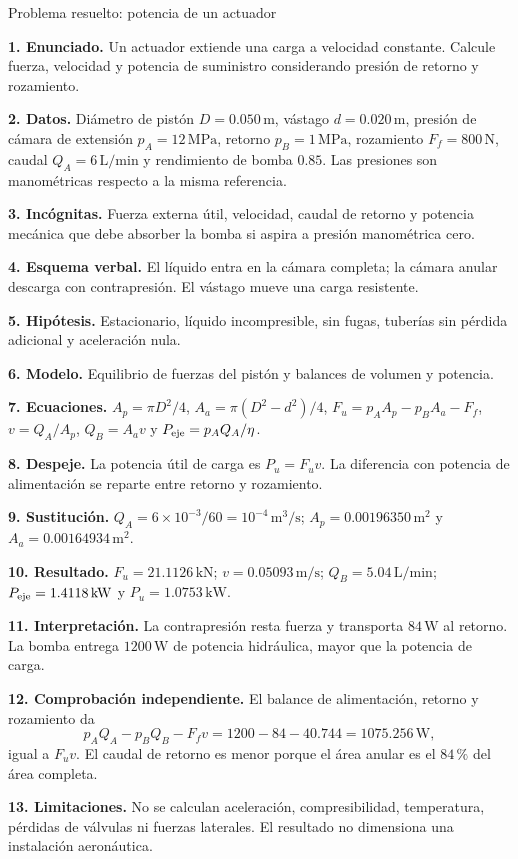 \begin{studiumworked}{Problema resuelto: potencia de un actuador}

\textbf{1. Enunciado.} Un actuador extiende una carga a velocidad constante. Calcule fuerza, velocidad y potencia de suministro considerando presión de retorno y rozamiento.

\textbf{2. Datos.} Diámetro de pistón $D=0.050\,\mathrm{m}$, vástago $d=0.020\,\mathrm{m}$, presión de cámara de extensión $p_A=12\,\mathrm{MPa}$, retorno $p_B=1\,\mathrm{MPa}$, rozamiento $F_f=800\,\mathrm{N}$, caudal $Q_A=6\,\mathrm{L/min}$ y rendimiento de bomba $0.85$. Las presiones son manométricas respecto a la misma referencia.

\textbf{3. Incógnitas.} Fuerza externa útil, velocidad, caudal de retorno y potencia mecánica que debe absorber la bomba si aspira a presión manométrica cero.

\textbf{4. Esquema verbal.} El líquido entra en la cámara completa; la cámara anular descarga con contrapresión. El vástago mueve una carga resistente.

\textbf{5. Hipótesis.} Estacionario, líquido incompresible, sin fugas, tuberías sin pérdida adicional y aceleración nula.

\textbf{6. Modelo.} Equilibrio de fuerzas del pistón y balances de volumen y potencia.

\textbf{7. Ecuaciones.} $A_p=\pi D^2/4$, $A_a=\pi(D^2-d^2)/4$, $F_u=p_AA_p-p_BA_a-F_f$, $v=Q_A/A_p$, $Q_B=A_av$ y $P_{\rm eje}=p_AQ_A/\eta$.

\textbf{8. Despeje.} La potencia útil de carga es $P_u=F_uv$. La diferencia con potencia de alimentación se reparte entre retorno y rozamiento.

\textbf{9. Sustitución.} $Q_A=6\times10^{-3}/60=10^{-4}\,\mathrm{m^3/s}$; $A_p=0.00196350\,\mathrm{m^2}$ y $A_a=0.00164934\,\mathrm{m^2}$.

\textbf{10. Resultado.} $F_u=21.1126\,\mathrm{kN}$; $v=0.05093\,\mathrm{m/s}$; $Q_B=5.04\,\mathrm{L/min}$; $P_{\rm eje}=1.4118\,\mathrm{kW}$ y $P_u=1.0753\,\mathrm{kW}$.

\textbf{11. Interpretación.} La contrapresión resta fuerza y transporta $84\,\mathrm{W}$ al retorno. La bomba entrega $1200\,\mathrm{W}$ de potencia hidráulica, mayor que la potencia de carga.

\textbf{12. Comprobación independiente.} El balance de alimentación, retorno y rozamiento da
\begin{equation}
 p_AQ_A-p_BQ_B-F_fv=1200-84-40.744=1075.256\,\mathrm{W},
\end{equation}
igual a $F_uv$. El caudal de retorno es menor porque el área anular es el $84\,\text{\%}$ del área completa.

\textbf{13. Limitaciones.} No se calculan aceleración, compresibilidad, temperatura, pérdidas de válvulas ni fuerzas laterales. El resultado no dimensiona una instalación aeronáutica.


\end{studiumworked}

